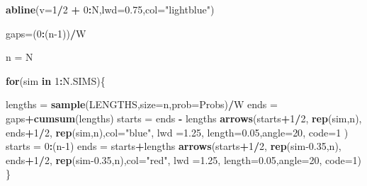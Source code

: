 \documentclass[]{book}
\newenvironment{Shaded}{\begin{snugshade}}{\end{snugshade}}
\newcommand{\ControlFlowTok}[1]{\textcolor[rgb]{0.13,0.29,0.53}{\textbf{#1}}}
\newcommand{\DataTypeTok}[1]{\textcolor[rgb]{0.13,0.29,0.53}{#1}}
\newcommand{\DecValTok}[1]{\textcolor[rgb]{0.00,0.00,0.81}{#1}}
\newcommand{\FloatTok}[1]{\textcolor[rgb]{0.00,0.00,0.81}{#1}}
\newcommand{\KeywordTok}[1]{\textcolor[rgb]{0.13,0.29,0.53}{\textbf{#1}}}
\newcommand{\NormalTok}[1]{#1}
\newcommand{\OperatorTok}[1]{\textcolor[rgb]{0.81,0.36,0.00}{\textbf{#1}}}
\newcommand{\StringTok}[1]{\textcolor[rgb]{0.31,0.60,0.02}{#1}}
\begin{document}
\begin{Shaded}
\begin{Highlighting}[]
\KeywordTok{abline}\NormalTok{(}\DataTypeTok{v=}\DecValTok{1}\OperatorTok{/}\DecValTok{2} \OperatorTok{+}\StringTok{ }\DecValTok{0}\OperatorTok{:}\NormalTok{N,}\DataTypeTok{lwd=}\FloatTok{0.75}\NormalTok{,}\DataTypeTok{col=}\StringTok{"lightblue"}\NormalTok{)}

\NormalTok{gaps=(}\DecValTok{0}\OperatorTok{:}\NormalTok{(n}\DecValTok{-1}\NormalTok{))}\OperatorTok{/}\NormalTok{W}

\NormalTok{n =}\StringTok{ }\NormalTok{N}

\ControlFlowTok{for}\NormalTok{(sim }\ControlFlowTok{in} \DecValTok{1}\OperatorTok{:}\NormalTok{N.SIMS)\{}
  
\NormalTok{  lengths =}\StringTok{ }\KeywordTok{sample}\NormalTok{(LENGTHS,}\DataTypeTok{size=}\NormalTok{n,}\DataTypeTok{prob=}\NormalTok{Probs)}\OperatorTok{/}\NormalTok{W}
\NormalTok{  ends    =}\StringTok{ }\NormalTok{gaps}\OperatorTok{+}\KeywordTok{cumsum}\NormalTok{(lengths)}
\NormalTok{  starts  =}\StringTok{ }\NormalTok{ends }\OperatorTok{-}\StringTok{ }\NormalTok{lengths}
  \KeywordTok{arrows}\NormalTok{(starts}\OperatorTok{+}\DecValTok{1}\OperatorTok{/}\DecValTok{2}\NormalTok{, }\KeywordTok{rep}\NormalTok{(sim,n), }
\NormalTok{           ends}\OperatorTok{+}\DecValTok{1}\OperatorTok{/}\DecValTok{2}\NormalTok{, }\KeywordTok{rep}\NormalTok{(sim,n),}\DataTypeTok{col=}\StringTok{"blue"}\NormalTok{, }
           \DataTypeTok{lwd =}\FloatTok{1.25}\NormalTok{,}
           \DataTypeTok{length=}\FloatTok{0.05}\NormalTok{,}\DataTypeTok{angle=}\DecValTok{20}\NormalTok{, }\DataTypeTok{code=}\DecValTok{1}
\NormalTok{         )}
\NormalTok{  starts =}\StringTok{ }\DecValTok{0}\OperatorTok{:}\NormalTok{(n}\DecValTok{-1}\NormalTok{)}
\NormalTok{  ends    =}\StringTok{ }\NormalTok{starts}\OperatorTok{+}\NormalTok{lengths}
  \KeywordTok{arrows}\NormalTok{(starts}\OperatorTok{+}\DecValTok{1}\OperatorTok{/}\DecValTok{2}\NormalTok{, }\KeywordTok{rep}\NormalTok{(sim}\FloatTok{-0.35}\NormalTok{,n), }
\NormalTok{           ends}\OperatorTok{+}\DecValTok{1}\OperatorTok{/}\DecValTok{2}\NormalTok{,   }
         \KeywordTok{rep}\NormalTok{(sim}\FloatTok{-0.35}\NormalTok{,n),}\DataTypeTok{col=}\StringTok{"red"}\NormalTok{,}
         \DataTypeTok{lwd =}\FloatTok{1.25}\NormalTok{,}
         \DataTypeTok{length=}\FloatTok{0.05}\NormalTok{,}\DataTypeTok{angle=}\DecValTok{20}\NormalTok{, }\DataTypeTok{code=}\DecValTok{1}\NormalTok{)}
\NormalTok{\}}
\end{Highlighting}
\end{Shaded}
\end{document}
